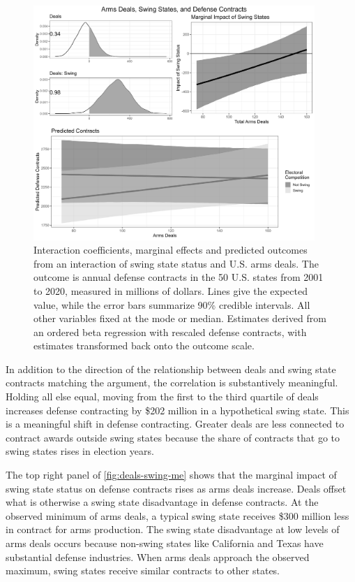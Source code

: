 \documentclass[12pt]{article}
\begin{document}
\begin{figure}[htpb]
	\centering
		\includegraphics[width=0.95\textwidth]{../figures/deals-swing-me.png}
	\caption{Interaction coefficients, marginal effects and predicted outcomes from an interaction of swing state status and U.S. arms deals. The outcome is annual defense contracts in the 50 U.S. states from 2001 to 2020, measured in millions of dollars. Lines give the expected value, while the error bars summarize 90\% credible intervals. All other variables fixed at the mode or median. Estimates derived from an ordered beta regression with rescaled defense contracts, with estimates transformed back onto the outcome scale.}
	\label{fig:deals-swing-me}
\end{figure}


In addition to the direction of the relationship between deals and swing state contracts matching the argument, the correlation is substantively meaningful. 
Holding all else equal, moving from the first to the third quartile of deals increases defense contracting by \$202 million in a hypothetical swing state. 
This is a meaningful shift in defense contracting. 
Greater deals are less connected to contract awards outside swing states because the share of contracts that go to swing states rises in election years. 


The top right panel of \autoref{fig:deals-swing-me} shows that the marginal impact of swing state status on defense contracts rises as arms deals increase.  
Deals offset what is otherwise a swing state disadvantage in defense contracts. 
At the observed minimum of arms deals, a typical swing state receives \$300 million less in contract for arms production.
The swing state disadvantage at low levels of arms deals occurs because non-swing states like California and Texas have substantial defense industries.
When arms deals approach the observed maximum, swing states receive similar contracts to other states. 
\end{document}
